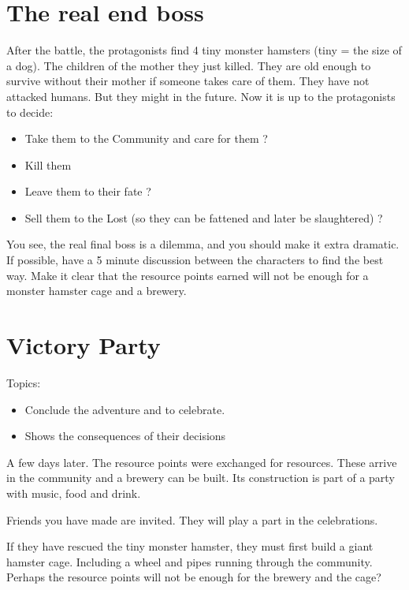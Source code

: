 \section{The real end boss}

After the battle, the protagonists find 4 tiny monster hamsters (tiny = the size of a dog). The children of the mother they just killed. They are old enough to survive without their mother if someone takes care of them. They have not attacked humans. But they might in the future. Now it is up to the protagonists to decide:

\begin{itemize}
    \item Take them to the Community and care for them ?
    \item Kill them
    \item Leave them to their fate ?
    \item Sell them to the Lost (so they can be fattened and later be slaughtered) ?
\end{itemize}

You see, the real final boss is a dilemma, and you should make it extra dramatic. If possible, have a 5 minute discussion between the characters to find the best way. Make it clear that the resource points earned will not be enough for a monster hamster cage and a brewery.

\section{Victory Party}

Topics:

\begin{itemize}
\item Conclude the adventure and to celebrate.
\item Shows the consequences of their decisions
\end{itemize}

A few days later. The resource points were exchanged for resources. These arrive in the community and a brewery can be built. Its construction is part of a party with music, food and drink.

Friends you have made are invited. They will play a part in the celebrations.

If they have rescued the tiny monster hamster, they must first build a giant hamster cage. Including a wheel and pipes running through the community. Perhaps the resource points will not be enough for the brewery and the cage?

